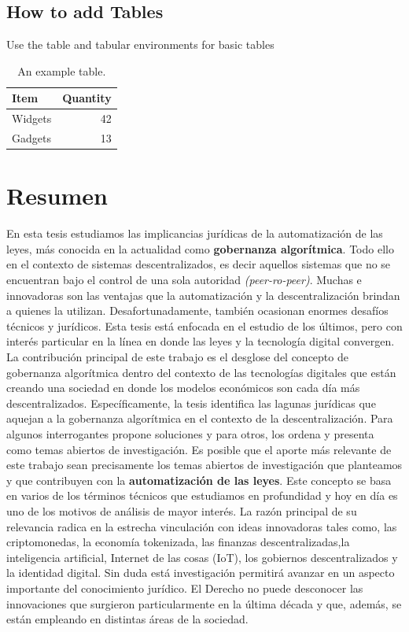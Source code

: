 \documentclass[12pt]{report} %
\begin{document}
\subsection{How to add Tables}

Use the table and tabular environments for basic tables  



\begin{table}
\centering
\begin{tabular}{l|r}

Item & Quantity \\
\hline

Widgets & 42 \\

Gadgets & 13
\end{tabular}
\caption{\label{tab:widgets}An example table.}
\end{table}





\section{Resumen}

En esta tesis estudiamos las implicancias jurídicas de la automatización de las leyes, más conocida en
la actualidad como \textbf{gobernanza algorítmica}. Todo ello en el contexto de sistemas descentralizados, es decir
aquellos sistemas que no se encuentran bajo el control de una sola autoridad \textit{(peer-ro-peer)}. Muchas e
innovadoras son las ventajas que la automatización y la descentralización brindan a quienes la utilizan.
Desafortunadamente, también ocasionan enormes desafíos técnicos y jurídicos. Esta tesis está enfocada en el
estudio de los últimos, pero con interés particular en la línea en donde las leyes y la tecnología digital
convergen. La contribución principal de este trabajo es el desglose del concepto de gobernanza algorítmica
dentro del contexto de las tecnologías digitales que están creando una sociedad en donde los modelos
económicos son cada día más descentralizados. Específicamente, la tesis identifica las lagunas jurídicas
que aquejan a la gobernanza algorítmica en el contexto de la descentralización. Para algunos interrogantes
propone soluciones y para otros, los ordena y presenta como temas abiertos de investigación. Es posible que
el aporte más relevante de este trabajo sean precisamente los temas abiertos de investigación que planteamos
y que contribuyen con la \textbf{automatización de las leyes}. Este concepto se basa en varios de los términos
técnicos que estudiamos en profundidad y hoy en día es uno de los motivos de análisis de mayor interés. La
razón principal de su relevancia radica en la estrecha vinculación con ideas innovadoras tales como, las
criptomonedas, la economía tokenizada, las finanzas descentralizadas,la inteligencia artificial, Internet de las cosas (IoT), los gobiernos descentralizados y la identidad digital. Sin duda está investigación permitirá avanzar en
un aspecto importante del conocimiento jurídico. El Derecho no puede desconocer las innovaciones que
surgieron particularmente en la última década y que, además, se están empleando en distintas áreas de la
sociedad.
\end{document}
